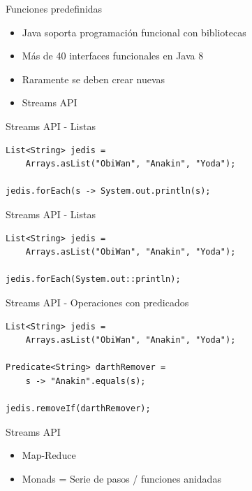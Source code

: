 \documentclass{beamer}
\begin{document}
\begin{frame}{Funciones predefinidas}
	\begin{itemize}
	\item Java soporta programación funcional con bibliotecas
	\item Más de 40 interfaces funcionales en Java 8
	\item Raramente se deben crear nuevas
	\item Streams API
	\end{itemize}
\end{frame}


\begin{frame}[fragile]{Streams API - Listas}
\begin{lstlisting}
List<String> jedis = 
	Arrays.asList("ObiWan", "Anakin", "Yoda");

jedis.forEach(s -> System.out.println(s);
\end{lstlisting}
\end{frame}


\begin{frame}[fragile]{Streams API - Listas}
\begin{lstlisting}
List<String> jedis = 
	Arrays.asList("ObiWan", "Anakin", "Yoda");

jedis.forEach(System.out::println);

\end{lstlisting}
\end{frame}


\begin{frame}[fragile]{Streams API - Operaciones con predicados}
\begin{lstlisting}
List<String> jedis = 
	Arrays.asList("ObiWan", "Anakin", "Yoda");

Predicate<String> darthRemover = 
	s -> "Anakin".equals(s);
	
jedis.removeIf(darthRemover);
\end{lstlisting}
\end{frame}

\begin{frame}[fragile]{Streams API}
	\begin{itemize}
	\item Map-Reduce
	\item Monads = Serie de pasos / funciones anidadas
	\end{itemize}
	
\end{frame}
\end{document}
